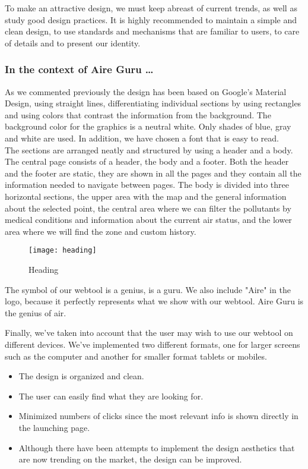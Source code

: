 To make an attractive design, we must keep abreast of current trends, as well as study good design practices.
It is highly recommended to maintain a simple and clean design, to use standards and mechanisms that are familiar to users,
to care of details and to present our identity.

\subsubsection*{In the context of Aire Guru \ldots}

As we commented previously the design has been based on Google's Material Design, using straight lines, differentiating individual sections by using rectangles and using colors that contrast the information from the background.
The background color for the graphics is a neutral white. Only shades of blue, gray and white are used. In addition, we have chosen a font that is easy to read.\\

The sections are arranged neatly and structured by using a header and a body.\\

The central page consists of a header, the body and a footer. Both the header and the footer are static,
they are shown in all the pages and they contain all the information needed to navigate between pages.
The body is divided into three horizontal sections, the upper area with the map and the general information about the selected point,
the central area where we can filter the pollutants by medical conditions and information about the current air status, and the
lower area where we will find the zone and custom history.

\begin{figure}[ht]
    \centering
    \texttt{[image: heading]}
    \caption{Heading}
\end{figure}
 
The symbol of our webtool is a genius, is a guru. We also include "Aire" in the logo, because it perfectly represents 
what we show with our webtool. Aire Guru is the genius of air.

Finally, we've taken into account that the user may wish to use our webtool on different devices. We've implemented
two different formats, one for larger screens such as the computer and another for smaller format tablets or mobiles.

\begin{itemize}
    \item The design is organized and clean. 
    \item The user can easily find what they are looking for.
    \item Minimized numbers of clicks since the most relevant info is shown directly in the launching page.
    \item Although there have been attempts to implement the design aesthetics that are now trending on the market, the design can be improved.
\end{itemize}